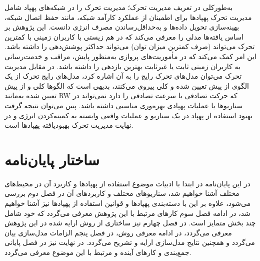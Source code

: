 به‌طورکلی در تعریف مدیریت تحرک؛ مدیریت تحرک را در شبکه‌های پهپاد شامل مدیریت تحرک پهپادها برای اطمینان از عملکرد کارآمد شبکه، مانند حفظ اتصال شبکه، بهینه‌سازی تحویل داده‌ها و به‌حداقل‌رساندن مصرف انرژی دانست. این پژوهش بر اساس یافته‌ها مدلی را معرفی می‌کند که در هم زیستی با کاربران زمینی با کمترین تحرک می‌تواند (صرف کمترین میزان توان) می‌تواند حداکثر پوشش‌دهی را داشته باشد. این امر کمک می‌کند که در مأموریت‌های پروازی به‌منظور پایش، مراقب و خدمت‌رسانی به کاربران زمینی ثابت یا غیرثابت بهترین بازدهی را داشته باشد.
در مقابل مدیریت تحرک می‌توان مدل‌های تحرک رایج را به آن اشاره کرد، مدل‌های رایج تحرک از یک الگوی از پیش تعیین شده و کلی پیروی می‌کنند، بدیهی است که الگوها کلی و از پیش تعیین شده به‌مانند \gls{RW} که حرکت تصادفی با سرعت تصادفی را دارد نمی‌تواند در سناریوها یا عملیات پهپادی بهره‌وری مناسبی داشته باشد. پس می‌توان نتیجه گرفت بهبود استفاده از پهپاد در یک سناریو و عملیات واقعی وابسته به کمینه‌کردن انرژی و در نهایت مدیریت تحرک بهبودیافته پهپادها است.


\section{ساختار پایان‌نامه}
در این پایان‌نامه در ابتدا با ادبیات موضوع استفاده از پهپاد‌ها و کاربرد آن در محیط‌های مختلف آشنا خواهیم شد، سناریو‌های مختلف و کاربر‌د‌های آن در فصل دوم بررسی می‌شود، علاوه بر این با دسته‌بندی پهپادها و قوانین استفاده از پهپاد‌ها نیز آشنا خواهیم شد، در ادامه فصل سوم کارهای مرتبط با این پژوهش معرفی می‌گردد که خود شامل چند بخش متمایز است. در فصل چهارم نیز ساختاری از روش ارایه شده در این پژوهش معرفی می‌گردد، در ادامه معرفی روش، در فصل پنجم الزامات مدل‌سازی بیان می‌گردد و همچنین نتایج مدل‌سازی ارایه و تشریح می‌گردد. در نهایت نیز در فصل پایانی جمع‌بندی و کار‌های آینده و مرتبط با این موضوع معرفی می‌گردد.


